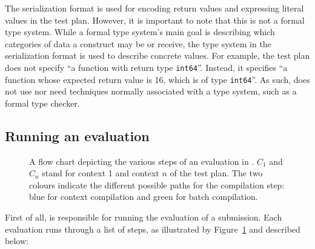 \documentclass[5p,number]{elsarticle}
\begin{document}
    The serialization format is used for encoding return values and expressing literal values in the test plan.
    However, it is important to note that this is not a formal type system.
    While a formal type system's main goal is describing which categories of data a construct may be or receive, the type system in the serialization format is used to describe concrete values.
    For example, the test plan does not specify ``a function with return type \texttt{int64}''.
    Instead, it specifies ``a function whose expected return value is 16, which is of type \texttt{int64}''.
    As such, \tested{} does not use nor need techniques normally associated with a type system, such as a formal type checker.

    \subsection{Running an evaluation}\label{subsec:running-an-evaluation}

    \begin{figure}
        \centering
        
        \caption{
        A flow chart depicting the various steps of an evaluation in \tested{}.
        $C_1$ and $C_n$ stand for context 1 and context $n$ of the test plan.
        The two colours indicate the different possible paths for the compilation step: blue for context compilation and green for batch compilation.
        }
        \label{fig:tested-flow}
    \end{figure}

    First of all, \tested{} is responsible for running the evaluation of a submission.
    Each evaluation runs through a list of steps, as illustrated by Figure~\ref{fig:tested-flow} and described below:
\end{document}
